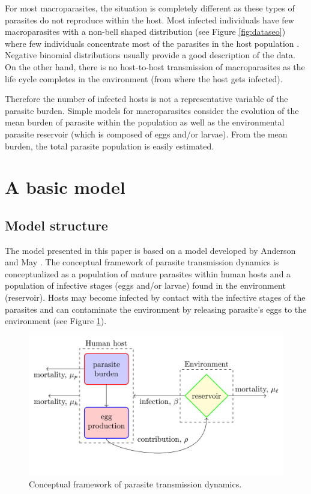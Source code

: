 \documentclass[eng]{MMSB-class-eng}
\begin{document}
For most macroparasites, the situation is completely different as these types of parasites do not reproduce within the host.  Most  infected  individuals have few macroparasites with a non-bell shaped distribution (see Figure \ref{fig:dataseo}) where few individuals concentrate most of the parasites in the host population \citep{seo1979frequency,lopez2022simple}. Negative binomial distributions usually provide a good description of the data. On the other hand, there is no host-to-host transmission of macroparasites as the life cycle completes in the environment (from where the host gets infected).  


Therefore the number of infected hosts is not a representative variable of the parasite burden. Simple models for macroparasites consider the evolution of the mean burden of parasite within the population as well as the environmental parasite reservoir (which is composed of eggs and/or larvae). From the mean burden, the total parasite population is easily estimated. 


\section{A basic model}
\label{s:basicmodel}

\subsection{Model structure}
\label{ss:structure}
The model presented in this paper is based on a model developed by Anderson and May \citep{anderson1992infectious}.
The conceptual framework of parasite transmission dynamics is conceptualized as a population of mature parasites within human hosts and a population of infective stages (eggs and/or larvae) found in the environment (reservoir).
Hosts may become infected by contact with the infective stages of the parasites 
and can contaminate the environment by releasing parasite's eggs to the environment (see Figure \ref{f:diagram}). 
\begin{figure}[h!]
	\centering
	\includegraphics[width=0.99\linewidth]{diagram}
	\caption{Conceptual framework of parasite transmission dynamics.}
	\label{f:diagram}
\end{figure}
\end{document}
